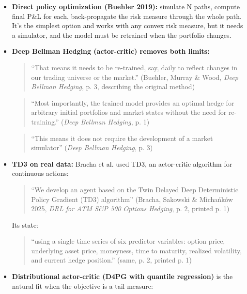 \documentclass{article}
\begin{document}
\begin{itemize}

\item \textbf{Direct policy optimization (Buehler 2019):} simulate N paths, compute final P\&L for each, back-propagate the risk measure through the whole path. It's the simplest option and works with any convex risk measure, but it needs a simulator, and the model must be retrained when the portfolio changes.

\item \textbf{Deep Bellman Hedging (actor-critic) removes both limits:}

\begin{quote}``That means it needs to be re-trained, say, daily to reflect changes in our trading universe or the market.'' (Buehler, Murray \& Wood, \emph{Deep Bellman Hedging}, p. 3, describing the original method)\end{quote}

\begin{quote}``Most importantly, the trained model provides an optimal hedge for arbitrary initial portfolios and market states without the need for re-training.'' (\emph{Deep Bellman Hedging}, p. 1)\end{quote}

\begin{quote}``This means it does not require the development of a market simulator'' (\emph{Deep Bellman Hedging}, p. 3)\end{quote}

\item \textbf{TD3 on real data:} Bracha et al. used TD3, an actor-critic algorithm for continuous actions:

\begin{quote}``We develop an agent based on the Twin Delayed Deep Deterministic Policy Gradient (TD3) algorithm'' (Bracha, Sakowski \& Michańków 2025, \emph{DRL for ATM S\&P 500 Options Hedging}, p. 2, printed p. 1)\end{quote}

Its state:

\begin{quote}``using a single time series of six predictor variables: option price, underlying asset price, moneyness, time to maturity, realized volatility, and current hedge position.'' (same, p. 2, printed p. 1)\end{quote}

\item \textbf{Distributional actor-critic (D4PG with quantile regression)} is the natural fit when the objective is a tail measure:


\end{itemize}
\end{document}
